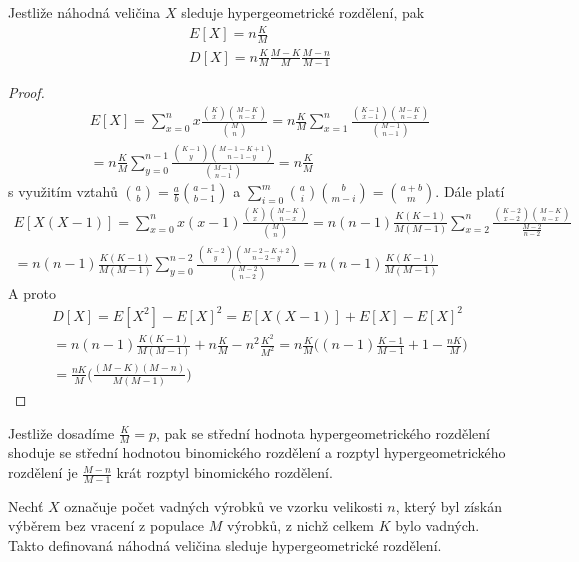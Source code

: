 \begin{theorem}
Jestliže náhodná veličina $X$ sleduje hypergeometrické rozdělení, pak
\begin{gather*}
E[X] = n \frac{K}{M}\\
D[X] = n \frac{K}{M} \frac{M-K}{M}\frac{M-n}{M-1}
\end{gather*}
\end{theorem}

\begin{proof}
\begin{gather*}
E[X] = \sum_{x=0}^n x \frac{\binom{K}{x}\binom{M - K}{n-x}}{\binom{M}{n}} = n \frac{K}{M}\sum_{x=1}^n \frac{\binom{K-1}{x-1}\binom{M-K}{n-x}}{\binom{M-1}{n-1}}\\
= n \frac{K}{M} \sum_{y=0}^{n-1} \frac{\binom{K-1}{y}\binom{M-1-K+1}{n-1-y}}{\binom{M-1}{n-1}}=n \frac{K}{M}
\end{gather*}
s využitím vztahů $\binom{a}{b} = \frac{a}{b}\binom{a-1}{b-1}$ a $\sum_{i=0}^m \binom{a}{i}\binom{b}{m-i} = \binom{a + b}{m}$. Dále platí
\begin{gather*}
E[X(X-1)] = \sum_{x = 0}^n x(x-1)\frac{\binom{K}{x} \binom{M-K}{n-x}}{\binom{M}{n}} = n(n-1)\frac{K(K-1)}{M(M-1)}\sum_{x=2}^n \frac{\binom{K-2}{x-2}\binom{M-K}{n-x}}{\frac{M-2}{n-2}}\\
= n(n-1)\frac{K(K-1)}{M(M-1)}\sum_{y=0}^{n-2} \frac{\binom{K-2}{y}\binom{M-2-K+2}{n-2-y}}{\binom{M-2}{n-2}} = n (n-1) \frac{K(K-1)}{M(M-1)}
\end{gather*}
A proto
\begin{gather*}
D[X] = E[X^2] - E[X]^2 = E[X(X-1)] + E[X] - E[X]^2\\
= n(n-1)\frac{K(K-1)}{M(M-1)} + n \frac{K}{M}-n^2 \frac{K^2}{M^2} = n \frac{K}{M}\Big((n-1)\frac{K-1}{M-1} + 1 - \frac{nK}{M} \Big)\\
= \frac{nK}{M}\Big(\frac{(M-K)(M-n)}{M(M-1)} \Big)
\end{gather*}
\end{proof}

Jestliže dosadíme $\frac{K}{M} = p$, pak se střední hodnota hypergeometrického rozdělení shoduje se střední hodnotou binomického rozdělení a rozptyl hypergeometrického rozdělení je $\frac{M-n}{M-1}$ krát rozptyl binomického rozdělení.

\begin{example}
Nechť $X$ označuje počet vadných výrobků ve vzorku velikosti $n$, který byl získán výběrem bez vracení z populace $M$ výrobků, z nichž celkem $K$ bylo vadných. Takto definovaná náhodná veličina sleduje hypergeometrické rozdělení.
\end{example}

